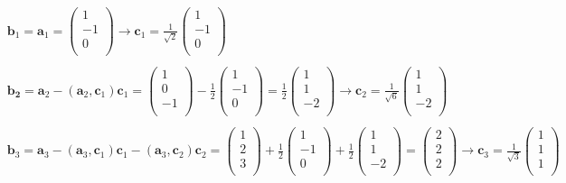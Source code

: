 \documentclass[dvipdfmx,uplatex,11pt]{jsarticle}
\begin{document}
\begin{eqnarray*}
& \bm{b}_1=\bm{a}_1=
\begin{pmatrix}
1 \\
-1 \\
0 \\
\end{pmatrix}
\longrightarrow
\bm{c}_1=\frac{1}{\sqrt{2}}
\begin{pmatrix}
1 \\
-1 \\
0 \\
\end{pmatrix}
\\ \\
& \bm{b_2}=\bm{a}_2-(\bm{a}_2, \bm{c}_1)\bm{c}_1=
\begin{pmatrix}
1 \\
0 \\
-1 \\
\end{pmatrix}
-\frac{1}{2}
\begin{pmatrix}
1 \\
-1 \\
0 \\
\end{pmatrix}
=\frac{1}{2}
\begin{pmatrix}
1 \\
1 \\
-2 \\
\end{pmatrix}
\longrightarrow
\bm{c}_2 =\frac{1}{\sqrt{6}}
\begin{pmatrix}
1 \\
1 \\
-2 \\
\end{pmatrix}
\\ \\
& \bm{b}_3=\bm{a}_3-(\bm{a}_3, \bm{c}_1)\bm{c}_1 -(\bm{a}_3, \bm{c}_2)\bm{c}_2=
\begin{pmatrix}
1 \\
2 \\
3 \\
\end{pmatrix}
+\frac{1}{2}
\begin{pmatrix}
1 \\
-1 \\
0 \\
\end{pmatrix}
+\frac{1}{2}
\begin{pmatrix}
1 \\
1 \\
-2 \\
\end{pmatrix}
=
\begin{pmatrix}
2 \\
2 \\
2 \\
\end{pmatrix}
\longrightarrow 
\bm{c}_3 =\frac{1}{\sqrt{3}}
\begin{pmatrix}
1 \\
1 \\
1 \\
\end{pmatrix}
\end{eqnarray*}
\end{document}
